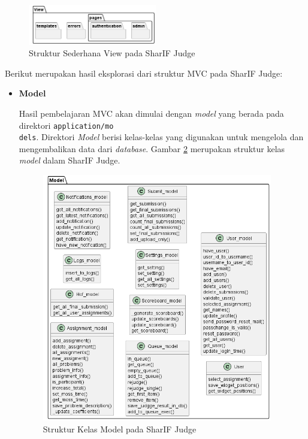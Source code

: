 \documentclass[a4paper,twoside]{article}
\begin{document}
\begin{enumerate}
	      \begin{figure}[H]
		      \centering
		      \includegraphics[width=0.5\textwidth]{analisis/class/class_view.png}
		      \caption{Struktur Sederhana View pada SharIF Judge}
		      \label{fig:3:1:view}
	      \end{figure}

	      Berikut merupakan hasil eksplorasi dari struktur MVC pada SharIF Judge:

	      \begin{itemize}
		      \item \textbf{Model}
		            \label{sub:3:1:1:model}

		            Hasil pembelajaran MVC akan dimulai dengan \textit{model} yang berada pada direktori \verb|application/mo|\\\verb|dels|. Direktori \textit{Model} berisi kelas-kelas yang digunakan untuk mengelola dan mengembalikan data dari \textit{database}. Gambar \ref{fig:3:1:1:model} merupakan struktur kelas \textit{model} dalam SharIF Judge.
		            \begin{figure}[H]
			            \centering
			            \includegraphics[width=0.95\textwidth]{analisis/mvc/model.png}
			            \caption{Struktur Kelas Model pada SharIF Judge}
			            \label{fig:3:1:1:model}
		            \end{figure}


\end{itemize}
\end{enumerate}
\end{document}
